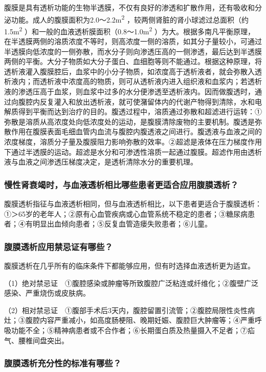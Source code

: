 腹膜是具有透析功能的生物半透膜，不仅有良好的渗透和扩散作用，还有吸收和分泌功能。成人的腹膜面积为2.0～2.2m\textsuperscript{2}
，较两侧肾脏的肾小球滤过总面积（约1.5m\textsuperscript{2}
）和一般的血液透析膜面积（0.8～1.0m\textsuperscript{2}
）为大。根据多南凡平衡原理，在半透膜两侧的溶质浓度不等时，则高浓度一侧的溶质，如其分子量较小，可通过半透膜向低浓度的一侧弥散，而水分子则向渗透压高的一侧渗透，最后达到半透膜两侧的平衡。大分子物质如大分子蛋白、血细胞等则不能通过。根据这种原理，将透析液灌入腹膜腔后，血浆中的小分子物质，如浓度高于透析液者，就会弥散入透析液内；而透析液中浓度高的物质，则可从透析液内进入组织液和血浆内；若透析液的渗透压高于血浆，则血浆中过多的水分便渗透至透析液内。因而做腹透时，通过向腹腔内反复灌入和放出透析液，就可使潴留体内的代谢产物得到清除，水和电解质得到平衡而达到治疗的目的。腹透过程中，溶质通过弥散和超滤进行运转：①弥散是溶质从高浓度处向低浓度处的运动，是腹膜清除废物的主要机制。腹透是弥散作用在腹膜表面毛细血管内血流与腹腔内腹透液之间进行。腹透液与血液之间的浓度梯度，溶质分子量及腹膜阻力影响弥散的效率。②超滤是液体在压力梯度作用下通过半透膜的运动。超滤是水分和可渗透性溶质一起通过腹膜。超滤作用由透析液与血液之间渗透压梯度决定，是透析清除水分的重要机理。

\subsubsection{慢性肾衰竭时，与血液透析相比哪些患者更适合应用腹膜透析？}

腹膜透析指征与血液透析相同，但与血液透析相比，以下患者更适合于腹膜透析：①＞65岁的老年人；②原有心血管疾病或心血管系统不稳定的患者；③糖尿病患者；④有明显出血倾向患者；⑤反复血管造瘘失败患者；⑥儿童。

\subsubsection{腹膜透析应用禁忌证有哪些？}

腹膜透析在几乎所有的临床条件下都能够应用，但有时选择血液透析更为适宜。

（1）绝对禁忌证　①腹腔感染或肿瘤等所致腹腔广泛粘连或纤维化；②腹壁广泛感染、严重烧伤或皮肤病。

（2）相对禁忌证　①腹部手术后3天内，腹腔留置引流管；②腹腔局限性炎性病灶；③腹腔内容严重减小，如高度肠梗阻、晚期妊娠、腹腔巨大肿瘤等；④严重呼吸功能不全；⑤精神病患者或不合作者；⑥长期蛋白质及热量摄入不足者；⑦疝气、腰椎间盘突出。

\subsubsection{腹膜透析充分性的标准有哪些？}

